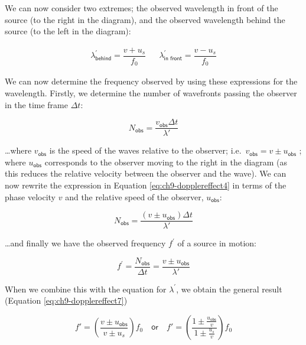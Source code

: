 \documentclass[
]{book}
\begin{document}
We can now consider two extremes; the observed wavelength in front of the source (to the right in the diagram), and the observed wavelength behind the source (to the left in the diagram):

\begin{equation}
\begin{array}{rcl}
\lambda^\prime_{\textsf{behind}} = \dfrac{v+u_{s}}{f_{0}} && \lambda^\prime_{\textsf{in front}} = \dfrac{v-u_{s}}{f_{0}}
\end{array}
\label{eq:ch9-dopplereffect3}
\end{equation}

We can now determine the frequency observed by using these expressions for the wavelength. Firstly, we determine the number of wavefronts passing the observer in the time frame \(\Delta t\):

\begin{equation}
N_{\textsf{obs}} = \frac{v_{\textsf{obs}}\Delta t}{\lambda'}
\label{eq:ch9-dopplereffect4}
\end{equation}

\ldots where \(v_{\textsf{obs}}\) is the speed of the waves relative to the observer; i.e.~\(v_{\textsf{obs}} = v \pm u_{\textsf{obs}}\) ; where \(u_{\textsf{obs}}\) corresponds to the observer moving to the right in the diagram (as this reduces the relative velocity between the observer and the wave). We can now rewrite the expression in Equation \eqref{eq:ch9-dopplereffect4} in terms of the phase velocity \(v\) and the relative speed of the observer, \(u_{\textsf{obs}}\):

\begin{equation}
N_{\textsf{obs}} = \frac{(v \pm u_{\textsf{obs}})\Delta t}{\lambda'}
\label{eq:ch9-dopplereffect5}
\end{equation}

\ldots and finally we have the observed frequency \(f^\prime\) of a source in motion:

\begin{equation}
f^\prime = \frac{N_{\textsf{obs}}}{\Delta t} = \frac{v\pm u_{\textsf{obs}}}{\lambda'}
\label{eq:ch9-dopplereffect6}
\end{equation}

When we combine this with the equation for \(\lambda^\prime\), we obtain the general result (Equation \eqref{eq:ch9-dopplereffect7})

\begin{equation}
f' = \left(\frac{v\pm u_{\textsf{obs}}}{v\pm u_{s}}\right)f_{0}\quad\textsf{or}\quad f' = \left(\frac{1\pm \frac{u_{\textsf{obs}}}{v}}{1\pm \frac{u_{s}}{v}}\right)f_{0}
\label{eq:ch9-dopplereffect7}
\end{equation}
\end{document}
